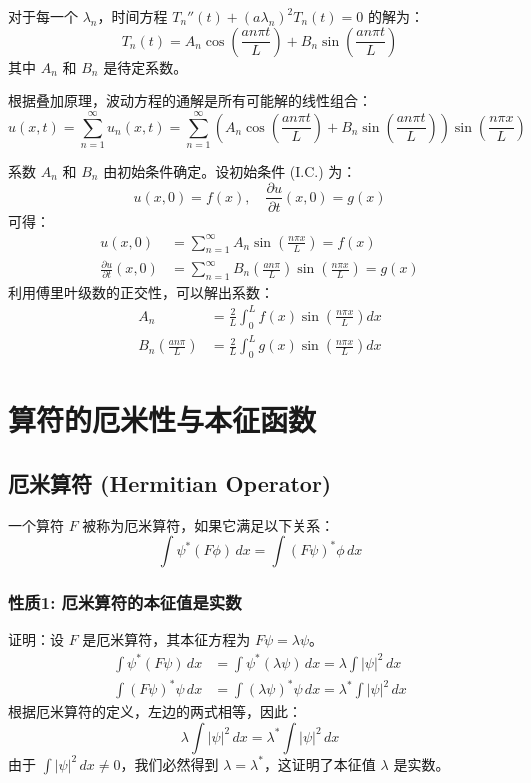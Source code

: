 \documentclass{article}
\begin{document}
	对于每一个 $\lambda_n$，时间方程 $T_n''(t) + (a\lambda_n)^2 T_n(t) = 0$ 的解为：
	$$ T_n(t) = A_n \cos\left(\frac{an\pi t}{L}\right) + B_n \sin\left(\frac{an\pi t}{L}\right) $$
	其中 $A_n$ 和 $B_n$ 是待定系数。
	
	根据叠加原理，波动方程的通解是所有可能解的线性组合：
	$$ u(x,t) = \sum_{n=1}^{\infty} u_n(x,t) = \sum_{n=1}^{\infty} \left(A_n \cos\left(\frac{an\pi t}{L}\right) + B_n \sin\left(\frac{an\pi t}{L}\right)\right) \sin\left(\frac{n\pi x}{L}\right) $$
	
	系数 $A_n$ 和 $B_n$ 由初始条件确定。设初始条件 (I.C.) 为：
	$$ u(x,0) = f(x), \quad \frac{\partial u}{\partial t}(x,0) = g(x) $$
	可得：
	\begin{align*}
		u(x,0) &= \sum_{n=1}^{\infty} A_n \sin\left(\frac{n\pi x}{L}\right) = f(x) \\
		\frac{\partial u}{\partial t}(x,0) &= \sum_{n=1}^{\infty} B_n \left(\frac{an\pi}{L}\right) \sin\left(\frac{n\pi x}{L}\right) = g(x)
	\end{align*}
	利用傅里叶级数的正交性，可以解出系数：
	\begin{align*}
		A_n &= \frac{2}{L} \int_0^L f(x) \sin\left(\frac{n\pi x}{L}\right) dx \\
		B_n \left(\frac{an\pi}{L}\right) &= \frac{2}{L} \int_0^L g(x) \sin\left(\frac{n\pi x}{L}\right) dx
	\end{align*}
	
	\section{算符的厄米性与本征函数}
	
	\subsection{厄米算符 (Hermitian Operator)}
	一个算符 $F$ 被称为厄米算符，如果它满足以下关系：
	$$ \int \psi^* (F\phi) \,dx = \int (F\psi)^* \phi \,dx $$
	
	\subsubsection*{性质1: 厄米算符的本征值是实数}
	证明：设 $F$ 是厄米算符，其本征方程为 $F\psi = \lambda\psi$。
	\begin{align*}
		\int \psi^* (F\psi) \,dx &= \int \psi^* (\lambda\psi) \,dx = \lambda \int |\psi|^2 \,dx \\
		\int (F\psi)^* \psi \,dx &= \int (\lambda\psi)^* \psi \,dx = \lambda^* \int |\psi|^2 \,dx
	\end{align*}
	根据厄米算符的定义，左边的两式相等，因此：
	$$ \lambda \int |\psi|^2 \,dx = \lambda^* \int |\psi|^2 \,dx $$
	由于 $\int |\psi|^2 \,dx \neq 0$，我们必然得到 $\lambda = \lambda^*$，这证明了本征值 $\lambda$ 是实数。
	
\end{document}
